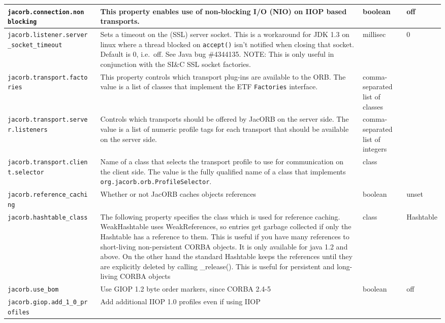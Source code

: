 \begin{small}
\begin{longtable}{|p{5cm}|p{7.5cm}|p{1.5cm}|p{1.5cm}|}
\verb"jacorb.connection.non"
\verb"blocking" & This property enables use of non-blocking I/O (NIO) on IIOP
based transports. & boolean & off \\
\hline

\verb"jacorb.listener.server"
\verb"_socket_timeout" & Sets a timeout on the (SSL) server socket. This is a
workaround for JDK 1.3 on linux where a thread blocked on \verb"accept()"
isn't notified when closing that socket. Default is 0, i.e.~off. See Java bug
\#4344135. NOTE: This is only useful in conjunction with the SI\&C SSL socket
factories. & millisec & 0\\
\hline

\verb"jacorb.transport.facto"
\verb"ries" & This property controls which transport plug-ins are
available to the ORB.  The value is a list of classes that implement the ETF
{\tt Factories} interface.
& comma-separated list of classes & \\
\hline
\verb"jacorb.transport.serve"
\verb"r.listeners" & Controls which transports should be offered by
JacORB on the server side.  The value is a list of numeric profile
tags for each transport that should be available on the server side.
& comma-separated list of integers & \\
\hline
\verb"jacorb.transport.clien"
\verb"t.selector" & Name of a class that selects the transport profile
to use for communication on the client side.  The value is the fully
qualified name of a class that implements {\tt
  org.jacorb.orb.ProfileSelector}.
& class & \\
\hline
\verb"jacorb.reference_cachi"
\verb"ng" & Whether or not JacORB caches objects references & boolean & unset  \\
\hline
\verb"jacorb.hashtable_class" & The following property specifies the
class which is used for reference caching. WeakHashtable uses
WeakReferences, so entries get garbage collected if only the Hashtable
has a reference to them. This is useful if you have many references to
short-living non-persistent CORBA objects. It is only available for
java 1.2 and above. On the other hand the standard Hashtable keeps the
references until they are explicitly deleted by calling
\_release(). This is useful for persistent and long-living CORBA
objects & class & Hashtable \\
\hline
\verb"jacorb.use_bom" & Use GIOP 1.2 byte order markers, since CORBA
2.4-5 & boolean & off  \\
\hline
\verb"jacorb.giop.add_1_0_pr"
\verb"ofiles" & Add additional IIOP 1.0 profiles even if using IIOP

\end{longtable}
\end{small}
